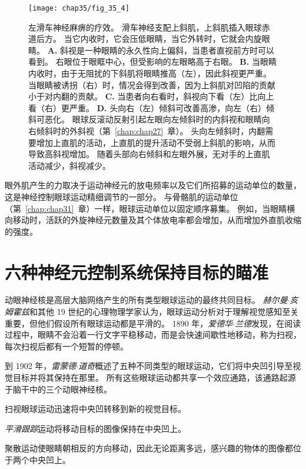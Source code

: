 \begin{figure}[htbp]
	\centering
	\texttt{[image: chap35/fig\_35\_4]}
	\caption{左滑车神经麻痹的疗效。
		滑车神经支配上斜肌，上斜肌插入眼球赤道后方。
		当它内收时，它会压低眼睛，当它外转时，它就会内旋眼睛。
		\textbf{A.} 斜视是一种眼睛的永久性向上偏斜，当患者直视前方时可以看到。
		右眼位于眼眶中心，但受影响的左眼略高于右眼。
		\textbf{B.} 当眼睛内收时，由于无阻扰的下斜肌将眼睛推高（左），因此斜视更严重。
		当眼睛被诱拐（右）时，情况会得到改善，因为上斜肌对凹陷的贡献小于对内翻的贡献。
		\textbf{C.} 当患者向右看时，斜视向下看（左）比向上看（右）更严重。
		\textbf{D.} 头向右（左）倾斜可改善高渗，向左（右）倾斜可恶化。
		眼球反滚动反射引起左眼向左倾斜时的内斜视和眼睛向右倾斜时的外斜视（第~\ref{chap:chap27}~章）。
		头向左倾斜时，内翻需要增加上直肌的活动，上直肌的提升活动不受弱上斜肌的影响，从而导致高斜视增加。
		随着头部向右倾斜和左眼外展，无对手的上直肌活动减少，斜视减少。}
	\label{fig:35_4}
\end{figure}


眼外肌产生的力取决于运动神经元的放电频率以及它们所招募的运动单位的数量，这是神经控制眼球运动精细调节的一部分。
与骨骼肌的运动单位（第~\ref{chap:chap31}~章）一样，眼球运动单位以固定顺序募集。
例如，当眼睛横向移动时，活跃的外旋神经元数量及其个体放电率都会增加，从而增加外直肌收缩的强度。



\section{六种神经元控制系统保持目标的瞄准}

动眼神经核是高层大脑网络产生的所有类型眼球运动的最终共同目标。
\textit{赫尔曼$\cdot$亥姆霍兹}和其他 19 世纪的心理物理学家认为，眼球运动分析对于理解视觉感知至关重要，但他们假设所有眼球运动都是平滑的。
1890 年，\textit{爱德华$\cdot$兰德}发现，在阅读过程中，眼睛不会沿着一行文字平稳移动，而是会快速间歇性地移动，称为扫视，每次扫视后都有一个短暂的停顿。


到 1902 年，\textit{雷蒙德$\cdot$道奇}概述了五种不同类型的眼球运动，它们将中央凹引导至视觉目标并将其保持在那里。
所有这些眼球运动都共享一个效应通路，该通路起源于脑干中的三个动眼神经核。


扫视眼球运动迅速将中央凹转移到新的视觉目标。


\textit{平滑跟踪}运动将移动目标的图像保持在中央凹上。


聚散运动使眼睛朝相反的方向移动，因此无论距离多远，感兴趣的物体的图像都位于两个中央凹上。


